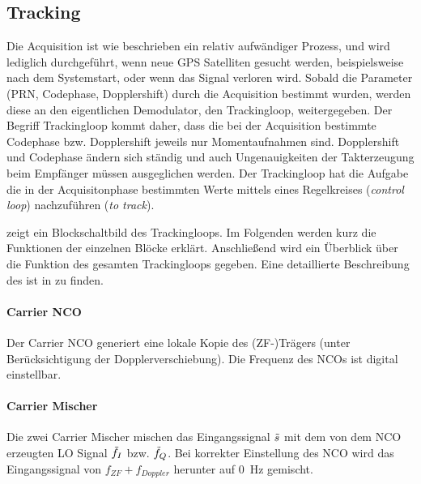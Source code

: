 \subsection{Tracking}
Die Acquisition ist wie beschrieben ein relativ aufwändiger Prozess, und wird lediglich durchgeführt, wenn neue GPS Satelliten gesucht werden, beispielsweise nach dem Systemstart, oder wenn das Signal verloren wird. Sobald die Parameter (PRN, Codephase, Dopplershift) durch die Acquisition bestimmt wurden, werden diese an den eigentlichen Demodulator, den Trackingloop, weitergegeben. Der Begriff Trackingloop kommt daher, dass die bei der Acquisition bestimmte Codephase bzw. Dopplershift jeweils nur Momentaufnahmen sind. Dopplershift und Codephase ändern sich ständig und auch Ungenauigkeiten der Takterzeugung beim Empfänger müssen ausgeglichen werden. Der Trackingloop hat die Aufgabe die in der Acquisitonphase bestimmten Werte mittels eines Regelkreises (\emph{control loop}) nachzuführen (\emph{to track}). 


 zeigt ein Blockschaltbild des Trackingloops. Im Folgenden werden kurz die Funktionen der einzelnen Blöcke erklärt. Anschließend wird ein Überblick über die Funktion des gesamten Trackingloops gegeben. Eine detaillierte Beschreibung des ist in \cite{borre2007software} zu finden.

\paragraph{Carrier NCO} Der Carrier \gls{NCO} generiert eine lokale Kopie des (ZF-)Trägers (unter Berücksichtigung der Dopplerverschiebung). Die Frequenz des NCOs ist digital einstellbar.

\paragraph{Carrier Mischer} Die zwei Carrier Mischer mischen das Eingangssignal $\tilde{s}$ mit dem von dem NCO erzeugten \gls{LO} Signal $\tilde{f}_I$ bzw. $\tilde{f}_Q$. Bei korrekter Einstellung des NCO wird das Eingangssignal von  $f_{ZF}+f_{Doppler}$ herunter auf \SI{0}{\Hz} gemischt.

